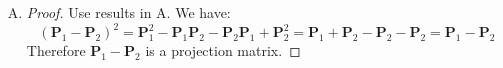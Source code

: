 \documentclass[12pt]{article}
\newcommand{\ttt}[1]{\textbf{#1}}
\begin{document}
\begin{enumerate}
\begin{enumerate}[A.]
\begin{proof}
            Because:
            $$(\ttt{I} - \ttt{P}_1)^\top \ttt{P}_2 (\ttt{I} - \ttt{P}_1) = (\ttt{I} - \ttt{P}_1)^\top \ttt{P}_2^\top \ttt{P}_2 (\ttt{I} - \ttt{P}_1) = (\ttt{P}_2 (\ttt{I} - \ttt{P}_1))^\top \ttt{P}_2 (\ttt{I} - \ttt{P}_1) = \ttt{0}$$ 
            We have $\ttt{P}_2 (\ttt{I} - \ttt{P}_1) = \ttt{0}$, which shows $\ttt{P}_2 = \ttt{P}_2 \ttt{P}_1$.
            Meanwhile we have $$\ttt{P}_2 = \ttt{P}_2^\top = (\ttt{P}_2 \ttt{P}_1)^\top = \ttt{P}_1^\top \ttt{P}_2^\top = \ttt{P}_1 \ttt{P}_1$$
            Therefore $\ttt{P}_1 \ttt{P}_2 = \ttt{P}_2 \ttt{P}_1 = \ttt{P}_2$.
        \end{proof}

        \item 
        \begin{proof}
            Use results in A. We have:
            $$(\ttt{P}_1 - \ttt{P}_2)^2 = \ttt{P}_1^2 - \ttt{P}_1\ttt{P}_2 -\ttt{P}_2\ttt{P}_1 + \ttt{P}_2^2 = \ttt{P}_1 + \ttt{P}_2 - \ttt{P}_2 - \ttt{P}_2 = \ttt{P}_1 - \ttt{P}_2$$
            Therefore $\ttt{P}_1 - \ttt{P}_2$ is a projection matrix.
        \end{proof}
    \end{enumerate}

\end{enumerate}
\end{document}
